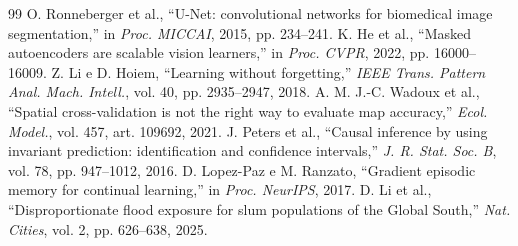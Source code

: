 \documentclass[conference]{IEEEtran}
\begin{document}
\begin{thebibliography}{99}
 O. Ronneberger et al., “U-Net: convolutional networks for biomedical image segmentation,” in \emph{Proc. MICCAI}, 2015, pp. 234--241.
 K. He et al., “Masked autoencoders are scalable vision learners,” in \emph{Proc. CVPR}, 2022, pp. 16000--16009.
 Z. Li e D. Hoiem, “Learning without forgetting,” \emph{IEEE Trans. Pattern Anal. Mach. Intell.}, vol. 40, pp. 2935--2947, 2018.
 A. M. J.-C. Wadoux et al., “Spatial cross-validation is not the right way to evaluate map accuracy,” \emph{Ecol. Model.}, vol. 457, art. 109692, 2021.
 J. Peters et al., “Causal inference by using invariant prediction: identification and confidence intervals,” \emph{J. R. Stat. Soc. B}, vol. 78, pp. 947--1012, 2016.
 D. Lopez-Paz e M. Ranzato, “Gradient episodic memory for continual learning,” in \emph{Proc. NeurIPS}, 2017.
 D. Li et al., “Disproportionate flood exposure for slum populations of the Global South,” \emph{Nat. Cities}, vol. 2, pp. 626--638, 2025.

\end{thebibliography}
\end{document}
